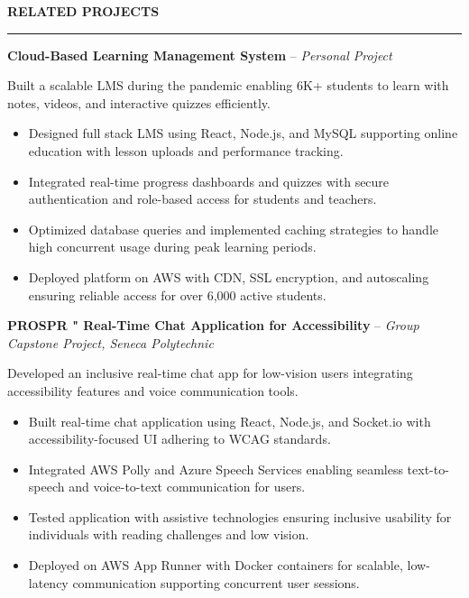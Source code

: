 \documentclass[10pt,letterpaper]{article}
\begin{document}
\vspace{6pt}

\textbf{RELATED PROJECTS}\\[-8pt]
\noindent\rule{\textwidth}{1pt}

\vspace{-2pt}

\textbf{Cloud-Based Learning Management System} -- \emph{Personal Project}

\vspace{-1pt}

Built a scalable LMS during the pandemic enabling 6K+ students to learn with notes, videos, and interactive quizzes efficiently.
\vspace{-1pt}
\begin{itemize}
\item Designed full stack LMS using React, Node.js, and MySQL supporting online education with lesson uploads and performance tracking.
\item Integrated real-time progress dashboards and quizzes with secure authentication and role-based access for students and teachers.
\item Optimized database queries and implemented caching strategies to handle high concurrent usage during peak learning periods.
\item Deployed platform on AWS with CDN, SSL encryption, and autoscaling ensuring reliable access for over 6,000 active students.
\end{itemize}

\textbf{PROSPR " Real-Time Chat Application for Accessibility} -- \emph{Group Capstone Project, Seneca Polytechnic}

\vspace{-1pt}

Developed an inclusive real-time chat app for low-vision users integrating accessibility features and voice communication tools.
\vspace{-1pt}
\begin{itemize}
\item Built real-time chat application using React, Node.js, and Socket.io with accessibility-focused UI adhering to WCAG standards.
\item Integrated AWS Polly and Azure Speech Services enabling seamless text-to-speech and voice-to-text communication for users.
\item Tested application with assistive technologies ensuring inclusive usability for individuals with reading challenges and low vision.
\item Deployed on AWS App Runner with Docker containers for scalable, low-latency communication supporting concurrent user sessions.
\end{itemize}
\end{document}
